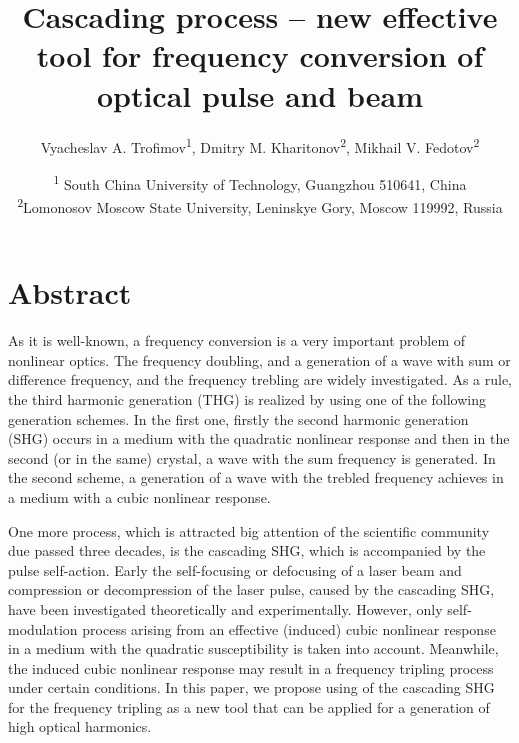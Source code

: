 \documentclass[a4paper, 12pt, onecolumn]{extarticle}
\begin{document}
\newtheorem{theorem}{Theorem}
\author{Vyacheslav A. Trofimov\textsuperscript{1}, Dmitry M. Kharitonov\textsuperscript{2}, Mikhail V. Fedotov\textsuperscript{2}}
\title{Cascading process -- new effective tool for frequency conversion of optical pulse and beam}
\date{\textsuperscript{1} South China University of Technology, Guangzhou 510641, China\\
\textsuperscript{2}Lomonosov Moscow State University, Leninskye Gory, Moscow 119992, Russia}
\maketitle
\section*{Abstract}
As it is well-known, a frequency conversion is a very important problem of nonlinear optics. The frequency doubling, and a generation of a wave with sum or difference frequency, and the frequency trebling are widely investigated. As a rule, the third harmonic generation (THG) is realized by using one of the following generation schemes. In the first one, firstly the second harmonic generation (SHG) occurs in a medium with the quadratic nonlinear response and then in the second (or in the same) crystal, a wave with the sum frequency is generated. In the second scheme, a generation of a wave with the trebled frequency achieves in a medium with a cubic nonlinear response.

One more process, which is attracted big attention of the scientific community due passed three decades, is the cascading SHG, which is accompanied by the pulse self-action. Early the self-focusing or defocusing of a laser beam and compression or decompression of the laser pulse, caused by the cascading SHG, have been investigated theoretically and experimentally. However, only self-modulation process arising from an effective (induced) cubic nonlinear response in a medium with the quadratic susceptibility is taken into account. Meanwhile, the induced cubic nonlinear response may result in a frequency tripling process under certain conditions. In this paper, we propose using of the cascading SHG for the frequency tripling as a new tool that can be applied for a generation of high optical harmonics.
\end{document}
